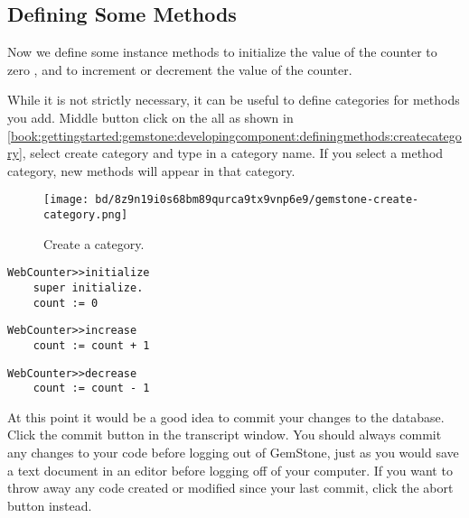 \documentclass[a4paper,10pt,twoside]{book}
\begin{document}
\subsection{Defining Some Methods}
\label{book:gettingstarted:gemstone:developingcomponent:definingmethods}

Now we define some instance methods to initialize the value of the counter to zero , and to increment or decrement  the value of the counter.

While it is not strictly necessary, it can be useful to define categories for methods you add. Middle button click on the all as shown in \autoref{book:gettingstarted:gemstone:developingcomponent:definingmethods:createcategory}, select create category and type in a category name. If you select a method category, new methods will appear in that category.

\begin{figure}[h!tbp]
	\begin{center}
		\texttt{[image: bd/8z9n19i0s68bm89qurca9tx9vnp6e9/gemstone-create-category.png]}
		\caption{Create a category.\label{book:gettingstarted:gemstone:developingcomponent:definingmethods:createcategory}}
	\end{center}
\end{figure}


\begin{lstlisting}
WebCounter>>initialize
    super initialize.
    count := 0
\end{lstlisting}

\begin{lstlisting}
WebCounter>>increase
    count := count + 1
\end{lstlisting}

\begin{lstlisting}
WebCounter>>decrease
    count := count - 1
\end{lstlisting}

At this point it would be a good idea to commit your changes to the database. Click the commit button in the transcript window. You should always commit any changes to your code before logging out of GemStone, just as you would save a text document in an editor before logging off of your computer. If you want to throw away any code created or modified since your last commit, click the abort button instead.
\end{document}

